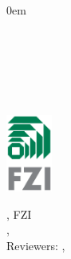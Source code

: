 \pagestyle{empty}
\begingroup
{}
\renewcommand{\baselinestretch}{1}

\begin{titlepage}
  \parindent 0em 
  \LARGE\textbf{\floatingtitle}
  \vspace{24pt}\\
  \\
  \myname \\[1.5cm]
  \begin{center}
  \titlefig\\[1cm]
  \end{center}
  \vfill
  \begin{minipage}{0.4\textwidth}
    \begin{flushleft} \large
      \LARGE\textbf{\thesistype}\\
      \LARGE\releasemonth
    \end{flushleft}
  \end{minipage}
  \begin{minipage}{0.6\textwidth}
    \begin{flushright}
      \includegraphics[width=1.5cm]{graphics/FZI-Logo}
    \end{flushright}
  \end{minipage}
  \newpage
  \small \thesistype, FZI\\
  \department, \releaseyear\\
  Reviewers: \reviewerone, \reviewertwo
  \vfill
  \fzidepartment\\
  \fziname
  \newpage
\end{titlepage}

\endgroup
